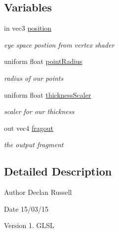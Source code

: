 \subsection*{Variables}
\begin{DoxyCompactItemize}
\item 
\hypertarget{thickness_frag_8glsl_a3ed508f736330bc856fb21ef562c1963}{in vec3 \hyperlink{thickness_frag_8glsl_a3ed508f736330bc856fb21ef562c1963}{position}}\label{thickness_frag_8glsl_a3ed508f736330bc856fb21ef562c1963}

\begin{DoxyCompactList}\small\item\em eye space postion from vertex shader \end{DoxyCompactList}\item 
\hypertarget{thickness_frag_8glsl_a59376561fcb9ace7e6531ad800fb1283}{uniform float \hyperlink{thickness_frag_8glsl_a59376561fcb9ace7e6531ad800fb1283}{point\-Radius}}\label{thickness_frag_8glsl_a59376561fcb9ace7e6531ad800fb1283}

\begin{DoxyCompactList}\small\item\em radius of our points \end{DoxyCompactList}\item 
\hypertarget{thickness_frag_8glsl_a18b0d87ec9f888da1e3236e988aaebaf}{uniform float \hyperlink{thickness_frag_8glsl_a18b0d87ec9f888da1e3236e988aaebaf}{thickness\-Scaler}}\label{thickness_frag_8glsl_a18b0d87ec9f888da1e3236e988aaebaf}

\begin{DoxyCompactList}\small\item\em scaler for our thickness \end{DoxyCompactList}\item 
\hypertarget{thickness_frag_8glsl_a575f888600764d6ebd67a3fd89a7d034}{out vec4 \hyperlink{thickness_frag_8glsl_a575f888600764d6ebd67a3fd89a7d034}{fragout}}\label{thickness_frag_8glsl_a575f888600764d6ebd67a3fd89a7d034}

\begin{DoxyCompactList}\small\item\em the output fragment \end{DoxyCompactList}\end{DoxyCompactItemize}


\subsection{Detailed Description}
\begin{DoxyAuthor}{Author}
Declan Russell 
\end{DoxyAuthor}
\begin{DoxyDate}{Date}
15/03/15 
\end{DoxyDate}
\begin{DoxyVersion}{Version}
1.  G\-L\-S\-L 
\end{DoxyVersion}

